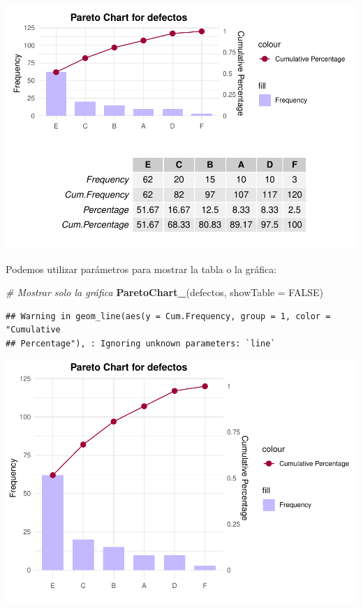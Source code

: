 \documentclass[
]{book}
\newenvironment{Shaded}{\begin{snugshade}}{\end{snugshade}}
\newcommand{\AttributeTok}[1]{\textcolor[rgb]{0.13,0.29,0.53}{#1}}
\newcommand{\CommentTok}[1]{\textcolor[rgb]{0.56,0.35,0.01}{\textit{#1}}}
\newcommand{\ConstantTok}[1]{\textcolor[rgb]{0.56,0.35,0.01}{#1}}
\newcommand{\FunctionTok}[1]{\textcolor[rgb]{0.13,0.29,0.53}{\textbf{#1}}}
\newcommand{\NormalTok}[1]{#1}
\begin{document}
\includegraphics{Libro_TidyQualityTools_files/figure-latex/unnamed-chunk-138-1.pdf}

Podemos utilizar parámetros para mostrar la tabla o la gráfica:

\begin{Shaded}
\begin{Highlighting}[]
\CommentTok{\# Mostrar solo la gráfica}
\FunctionTok{ParetoChart\_}\NormalTok{(defectos, }\AttributeTok{showTable =} \ConstantTok{FALSE}\NormalTok{)}
\end{Highlighting}
\end{Shaded}

\begin{verbatim}
## Warning in geom_line(aes(y = Cum.Frequency, group = 1, color = "Cumulative
## Percentage"), : Ignoring unknown parameters: `line`
\end{verbatim}

\includegraphics{Libro_TidyQualityTools_files/figure-latex/unnamed-chunk-139-1.pdf}
\end{document}
